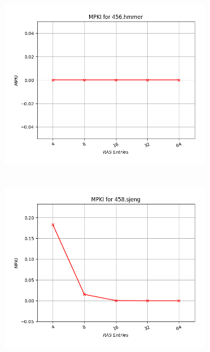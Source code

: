    \begin{minipage}{\textwidth}
      \begin{center}
         \\
         \vspace{3mm}
         \includegraphics[width=0.65\textwidth, frame]{./graphs/4-4/456-hmmer.png}
         \vspace{6mm}
      \end{center}
   \end{minipage}

   \begin{minipage}{\textwidth}
      \begin{center}
         \\
         \vspace{3mm}
         \includegraphics[width=0.65\textwidth, frame]{./graphs/4-4/458-sjeng.png}
         \vspace{6mm}
      \end{center}
   \end{minipage}

